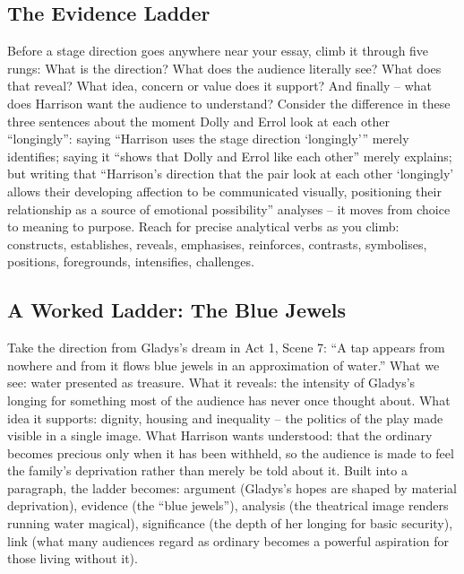 \documentclass[a4paper]{article}
\begin{document}
\subsection{The Evidence Ladder}
Before a stage direction goes anywhere near your essay, climb it through five rungs: What is the direction? What does the audience literally see? What does that reveal? What idea, concern or value does it support? And finally -- what does Harrison want the audience to understand? Consider the difference in these three sentences about the moment Dolly and Errol look at each other ``longingly'': saying ``Harrison uses the stage direction `longingly''' merely identifies; saying it ``shows that Dolly and Errol like each other'' merely explains; but writing that ``Harrison's direction that the pair look at each other `longingly' allows their developing affection to be communicated visually, positioning their relationship as a source of emotional possibility'' analyses -- it moves from choice to meaning to purpose. Reach for precise analytical verbs as you climb: constructs, establishes, reveals, emphasises, reinforces, contrasts, symbolises, positions, foregrounds, intensifies, challenges.\\

\subsection{A Worked Ladder: The Blue Jewels}
Take the direction from Gladys's dream in Act 1, Scene 7: ``A tap appears from nowhere and from it flows blue jewels in an approximation of water.'' What we see: water presented as treasure. What it reveals: the intensity of Gladys's longing for something most of the audience has never once thought about. What idea it supports: dignity, housing and inequality -- the politics of the play made visible in a single image. What Harrison wants understood: that the ordinary becomes precious only when it has been withheld, so the audience is made to feel the family's deprivation rather than merely be told about it. Built into a paragraph, the ladder becomes: argument (Gladys's hopes are shaped by material deprivation), evidence (the ``blue jewels''), analysis (the theatrical image renders running water magical), significance (the depth of her longing for basic security), link (what many audiences regard as ordinary becomes a powerful aspiration for those living without it).\\
\end{document}
